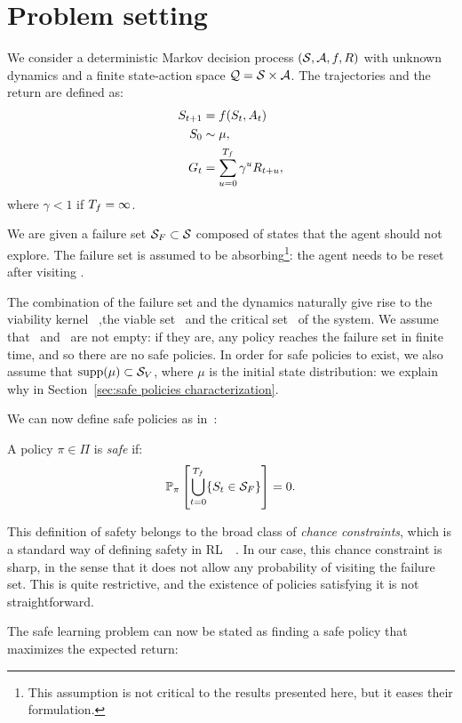 \section{Problem setting} \label{sec:setting}
We consider a deterministic Markov decision process $(\mathcal{S}, \mathcal{A}, f, R)$ with unknown dynamics and a finite state-action space $\mathcal{Q} = \mathcal{S}\times\mathcal{A}$. The trajectories and the return are defined as:
\begin{align}
	S_{t+1} & = f(S_t, A_t)\\
	S_0 & \sim \mu,\\
	G_t & = \sum_{u = 0}^{{T_f}} \gamma^uR_{t+u},
\end{align}
where $\gamma < 1$ if ${T_f} = \infty$.\par
We are given a failure set ${\mathcal{S}_{F}}\subset\mathcal{S}$ composed of states that the agent should not explore. The failure set is assumed to be absorbing\footnote{This assumption is not critical to the results presented here, but it eases their formulation.}: the agent needs to be reset after visiting \SF.\par
The combination of the failure set and the dynamics naturally give rise to the viability kernel \SV~,the viable set \QV~and the critical set \QC~of the system. We assume that \SV~and \QV~are not empty: if they are, any policy reaches the failure set in finite time, and so there are no safe policies. In order for safe policies to exist, we also assume that $\operatorname{supp}(\mu) \subset {\ensuremath{\mathcal{S}}_{V}}$, where $\mu$ is the initial state distribution: we explain why in Section~\ref{sec:safe policies characterization}.\par
We can now define safe policies as in~\cite{heim2020learnable}:
\begin{definition}
	A policy $\pi \in \Pi$ is\emph{ safe} if:
	\begin{equation}
		\mathbb{P}_\pi\left[\bigcup_{t=0}^{{T_f}}\{S_t\in{\ensuremath{\mathcal{S}}_{F}}\}\right] = 0. \label{eq:safety def}
	\end{equation}
\end{definition}
This definition of safety belongs to the broad class of\emph{ chance constraints}, which is a standard way of defining safety in RL~\cite{geibel2005risk}~\cite{paternain2019safe}. In our case, this chance constraint is sharp, in the sense that it does not allow any probability of visiting the failure set. This is quite restrictive, and the existence of policies satisfying it is not straightforward.\par
The safe learning problem can now be stated as finding a safe policy that maximizes the expected return:
